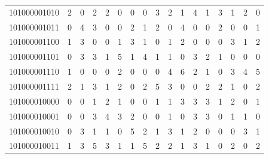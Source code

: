 \documentclass[10pt,a4paper]{article}
\begin{document}
\begin{longtable}{ |c|c|c|c|c|c|c|c|c|c|c|c|c|c|c|c|c| }
    101000001010              & 2                            & 0                                & 2                            & 2                              & 0   & 0   & 0   & 3   & 2   & 1   & 4   & 1   & 3   & 1   & 2   & 0   \\
    101000001011              & 0                            & 4                                & 3                            & 0                              & 0   & 2   & 1   & 2   & 0   & 4   & 0   & 0   & 2   & 0   & 0   & 1   \\
    101000001100              & 1                            & 3                                & 0                            & 0                              & 1   & 3   & 1   & 0   & 1   & 2   & 0   & 0   & 0   & 3   & 1   & 2   \\
    101000001101              & 0                            & 3                                & 3                            & 1                              & 5   & 1   & 4   & 1   & 1   & 0   & 3   & 2   & 1   & 0   & 0   & 0   \\
    101000001110              & 1                            & 0                                & 0                            & 0                              & 2   & 0   & 0   & 0   & 4   & 6   & 2   & 1   & 0   & 3   & 4   & 5   \\
    101000001111              & 2                            & 1                                & 3                            & 1                              & 2   & 0   & 2   & 5   & 3   & 0   & 0   & 2   & 2   & 1   & 0   & 2   \\
    101000010000              & 0                            & 0                                & 1                            & 2                              & 1   & 0   & 0   & 1   & 1   & 3   & 3   & 3   & 1   & 2   & 0   & 1   \\
    101000010001              & 0                            & 0                                & 3                            & 4                              & 3   & 2   & 0   & 0   & 1   & 0   & 3   & 3   & 0   & 1   & 1   & 0   \\
    101000010010              & 0                            & 3                                & 1                            & 1                              & 0   & 5   & 2   & 1   & 3   & 1   & 2   & 0   & 0   & 0   & 3   & 1   \\
    101000010011              & 1                            & 3                                & 5                            & 3                              & 1   & 1   & 5   & 2   & 2   & 1   & 3   & 1   & 0   & 2   & 0   & 2   \\

\end{longtable}
\end{document}
